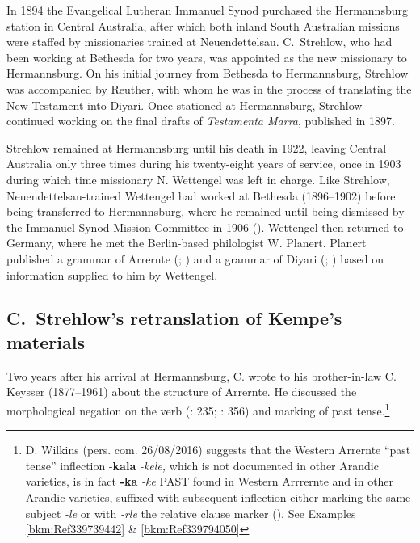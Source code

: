 In 1894 the Evangelical Lutheran Immanuel Synod purchased the Hermannsburg station in Central Australia, after which both inland South Australian missions were staffed by missionaries trained at Neuendettelsau. C.~Strehlow, who had been working at Bethesda for two years, was appointed as the new missionary to Hermannsburg. On his initial journey from Bethesda to Hermannsburg, Strehlow was accompanied by Reuther, with whom he was in the process of translating the New Testament into Diyari. Once stationed at Hermannsburg, Strehlow continued working on the final drafts of \textit{Testamenta Marra}, published in 1897.

Strehlow remained at Hermannsburg until his death in 1922, leaving Central Australia only three times during his twenty-eight years of service, once in 1903 during which time missionary N. Wettengel was left in charge. Like Strehlow, Neuendettelsau-trained Wettengel had worked at Bethesda (1896--1902) before being transferred to Hermannsburg, where he remained until being dismissed by the Immanuel Synod Mission Committee in 1906 (). Wettengel then returned to Germany, where he met the Berlin-based philologist W. Planert. Planert published a grammar of Arrernte (\citeyear{planert_australische_1907}; ) and a grammar of Diyari (\citeyear{planert_australische_1908}; ) based on information supplied to him by Wettengel.

\subsection{C.~Strehlow’s retranslation of Kempe’s materials}
\label{sec:key:9.2.1}\label{bkm:Ref326948956}

Two years after his arrival at Hermannsburg, C. \citet{strehlow_letter_1896} wrote to his brother-in-law C. Keysser (1877--1961) about the structure of Arrernte. He discussed the morphological negation on the verb (\citealt{wilkins_mparntwe_1989}: 235; \citealt{henderson_topics_2013}: 356) and marking of past tense.\footnote{D. Wilkins (pers. com. 26/08/2016) suggests that the Western Arrernte ``past tense'' inflection -\textbf{kala} \textit{-kele,} which is not documented in other Arandic varieties, is in fact \textbf{{}-ka} \textit{-ke} PAST found in Western Arrrernte and in other Arandic varieties, suffixed with subsequent inflection either marking the same subject \textit{-le} or with \textit{-rle} the relative clause marker (). See Examples \ref{bkm:Ref339739442} \& \ref{bkm:Ref339794050}}

